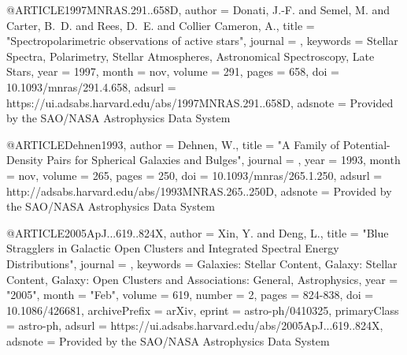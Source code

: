 \documentclass[apj]{emulateapj}
\begin{document}
@ARTICLE{1997MNRAS.291..658D,
   author = {{Donati}, J.-F. and {Semel}, M. and {Carter}, B.~D. and {Rees}, D.~E. and 
	{Collier Cameron}, A.},
    title = "{Spectropolarimetric observations of active stars}",
  journal = {\mnras},
 keywords = {Stellar Spectra, Polarimetry, Stellar Atmospheres, Astronomical Spectroscopy, Late Stars},
     year = 1997,
    month = nov,
   volume = 291,
    pages = {658},
      doi = {10.1093/mnras/291.4.658},
   adsurl = {https://ui.adsabs.harvard.edu/abs/1997MNRAS.291..658D},
  adsnote = {Provided by the SAO/NASA Astrophysics Data System}
}



@ARTICLE{Dehnen1993,
   author = {{Dehnen}, W.},
    title = "{A Family of Potential-Density Pairs for Spherical Galaxies and Bulges}",
  journal = {\mnras},
     year = 1993,
    month = nov,
   volume = 265,
    pages = {250},
      doi = {10.1093/mnras/265.1.250},
   adsurl = {http://adsabs.harvard.edu/abs/1993MNRAS.265..250D},
  adsnote = {Provided by the SAO/NASA Astrophysics Data System}
}


@ARTICLE{2005ApJ...619..824X,
       author = {{Xin}, Y. and {Deng}, L.},
        title = "{Blue Stragglers in Galactic Open Clusters and Integrated Spectral Energy Distributions}",
      journal = {\apj},
     keywords = {Galaxies: Stellar Content, Galaxy: Stellar Content, Galaxy: Open Clusters and Associations: General, Astrophysics},
         year = "2005",
        month = "Feb",
       volume = {619},
       number = {2},
        pages = {824-838},
          doi = {10.1086/426681},
archivePrefix = {arXiv},
       eprint = {astro-ph/0410325},
 primaryClass = {astro-ph},
       adsurl = {https://ui.adsabs.harvard.edu/abs/2005ApJ...619..824X},
      adsnote = {Provided by the SAO/NASA Astrophysics Data System}
}
\end{document}
